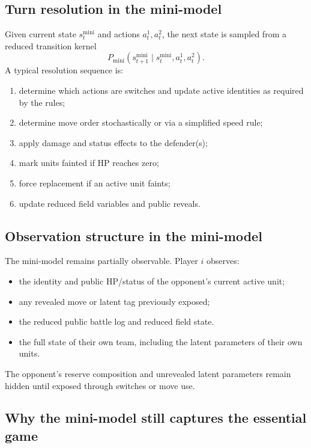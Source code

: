 \documentclass[aps,pre,twocolumn,superscriptaddress,nofootinbib]{revtex4-2}
\theoremstyle{definition}
\theoremstyle{plain}
\begin{document}
\subsection{Turn resolution in the mini-model}

Given current state $s_t^{\mathrm{mini}}$ and actions $a_t^1,a_t^2$, the next state is sampled from a reduced transition kernel
\begin{equation}
    P_{\mathrm{mini}}(s_{t+1}^{\mathrm{mini}}\mid s_t^{\mathrm{mini}},a_t^1,a_t^2).
\end{equation}
A typical resolution sequence is:
\begin{enumerate}
    \item determine which actions are switches and update active identities as required by the rules;
    \item determine move order stochastically or via a simplified speed rule;
    \item apply damage and status effects to the defender(s);
    \item mark units fainted if HP reaches zero;
    \item force replacement if an active unit faints;
    \item update reduced field variables and public reveals.
\end{enumerate}

\subsection{Observation structure in the mini-model}

The mini-model remains partially observable. Player $i$ observes:
\begin{itemize}
    \item the identity and public HP/status of the opponent's current active unit;
    \item any revealed move or latent tag previously exposed;
    \item the reduced public battle log and reduced field state.
    \item the full state of their own team, including the latent parameters of their own units.
\end{itemize}
The opponent's reserve composition and unrevealed latent parameters remain hidden until exposed through switches or move use.

\subsection{Why the mini-model still captures the essential game}
\end{document}

